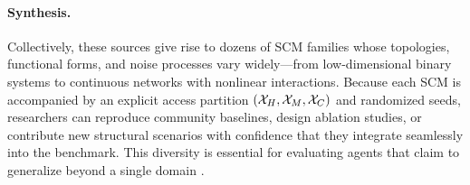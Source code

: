 \paragraph{Synthesis.}
Collectively, these sources give rise to dozens of SCM families whose topologies, functional forms, and noise processes vary widely—from low-dimensional binary systems to continuous networks with nonlinear interactions. Because each SCM is accompanied by an explicit access partition $(\mathcal{X}_H,\mathcal{X}_M,\mathcal{X}_C)$ and randomized seeds, researchers can reproduce community baselines, design ablation studies, or contribute new structural scenarios with confidence that they integrate seamlessly into the benchmark. This diversity is essential for evaluating agents that claim to generalize beyond a single domain \citep{RealCause2021,BayesianCausalDiscovery2023}.
